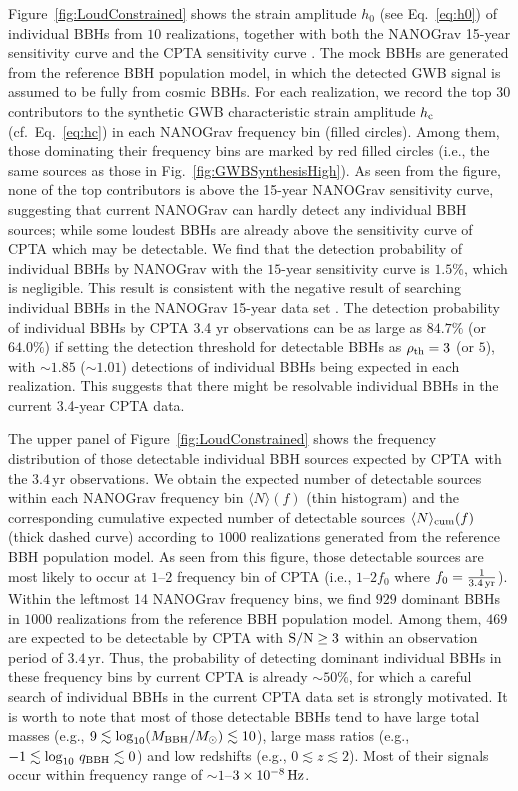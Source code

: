 \documentclass[twocolumn]{aastex631}
\newcommand{\rmc}{_{\rm c}}
\newcommand{\snr}{{\rm S/N}}
\newcommand{\rhoth}{{\rho_{\rm th}}}
\newcommand{\yr}{{\rm\,yr}}
\newcommand{\hz}{{\rm\,Hz}}
\begin{document}
Figure~\ref{fig:LoudConstrained} shows the strain amplitude $h_0$
(see Eq.~\ref{eq:h0}) of individual BBHs from $10$ realizations, together with
both the NANOGrav 15-year sensitivity curve \citep{NG23indv} and the CPTA
sensitivity curve \citep{CYL23cgws}.
%
The mock BBHs are generated from the reference BBH population model, in which
the detected GWB signal is assumed to be fully from cosmic BBHs. For each
realization, we record the top $30$ contributors to the synthetic GWB
characteristic strain amplitude $h\rmc$ (cf.~Eq.~\ref{eq:hc}) in each NANOGrav
frequency bin (filled circles). Among them, those dominating their frequency
bins are marked by red filled circles (i.e., the same sources as those in
Fig.~\ref{fig:GWBSynthesisHigh}). As seen from the figure, none of the top
contributors is above the 15-year NANOGrav sensitivity curve, suggesting that
current NANOGrav can hardly detect any individual BBH sources; while some
loudest BBHs are already above the sensitivity curve of CPTA which may be
detectable. 
We find that the detection probability of individual BBHs by NANOGrav with
the $15$-year sensitivity curve is $1.5\%$, which is negligible. This result is
consistent with the negative result of searching individual BBHs in the NANOGrav
15-year data set \citep[][similarly for EPTA, \citealt{EPTA23indv}]{NG23indv}.
%
The detection probability of individual BBHs by CPTA 3.4 yr observations can
be as large as $84.7\%$ (or $64.0\%$) if setting the detection
threshold for detectable BBHs as $\rhoth=3$ (or $5$), with $\sim 1.85$ ($\sim
1.01$) detections of individual BBHs being expected in each realization.
This suggests that there might be resolvable individual BBHs in the current 3.4-year
CPTA data. 

The upper panel of Figure~\ref{fig:LoudConstrained} shows the frequency
distribution of those detectable individual BBH sources expected by CPTA with
the $3.4$\,yr observations. We obtain the expected number of detectable sources
within each NANOGrav frequency bin $\langle N\rangle(f)$ (thin histogram) and
the corresponding cumulative expected number of detectable sources $\langle
N\rangle_{\rm cum}(f)$ (thick dashed curve) according to $1000$ realizations
generated from the reference BBH population model. As seen from this figure,
those detectable sources are most likely to occur at $1$--$2$ frequency bin of
CPTA (i.e., $1$--$2f_0$ where $f_0=\frac{1}{3.4\yr}$). Within the leftmost 14
NANOGrav frequency bins, we find $929$ dominant BBHs in $1000$ realizations from
the reference BBH population model. Among them, $469$ are expected to be
detectable by CPTA with $\snr\geq 3$ within an observation period of $3.4$\,yr.
Thus, the probability of detecting dominant individual BBHs in these frequency
bins by current CPTA is already $\sim 50\%$, for which a careful search of
individual BBHs in the current CPTA data set is strongly motivated. It is worth
to note that most of those detectable BBHs tend to have large total masses
(e.g., $9\lesssim \log_{10}(M_{\rm BBH}/M_\odot)\lesssim 10$), large mass
ratios (e.g., $-1\lesssim \log_{10}\,q_{\rm BBH}\lesssim 0$) and low
redshifts (e.g., $0\lesssim z\lesssim 2$). Most of their signals occur within
frequency range of $\sim 1$--$3\times 10^{-8}\hz$.
\end{document}
